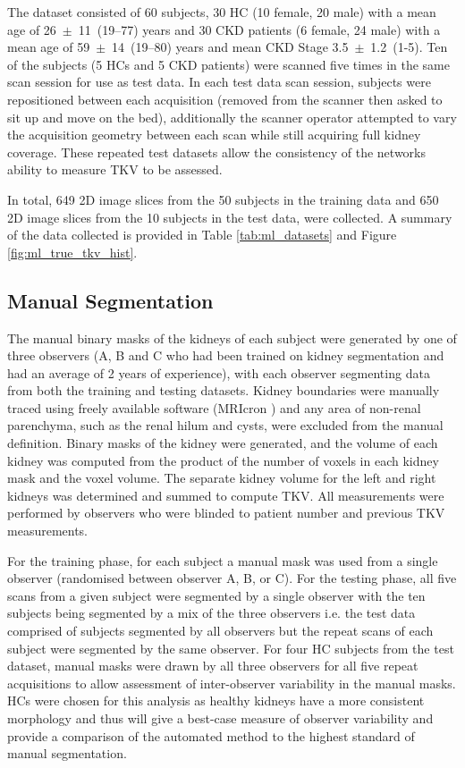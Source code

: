 \newpage
The dataset consisted of 60 subjects, 30 \ac{HC} (10 female, 20 male) with a mean age of 26~$\pm$~11~(19–77) years and 30 \ac{CKD} patients (6 female, 24 male) with a mean age of 59~$\pm$~14~(19–80) years and mean \ac{CKD} Stage 3.5~$\pm$~1.2~(1-5). Ten of the subjects (5 \ac{HC}s and 5 \ac{CKD} patients) were scanned five times in the same scan session for use as test data. In each test data scan session, subjects were repositioned between each acquisition (removed from the scanner then asked to sit up and move on the bed), additionally the scanner operator attempted to vary the acquisition geometry between each scan while still acquiring full kidney coverage. These repeated test datasets allow the consistency of the networks ability to measure \ac{TKV} to be assessed. 

In total, 649 2D image slices from the 50 subjects in the training data and 650 2D image slices from the 10 subjects in the test data, were collected. A summary of the data collected is provided in Table \ref{tab:ml_datasets} and Figure \ref{fig:ml_true_tkv_hist}.

\subsection{Manual Segmentation}
The manual binary masks of the kidneys of each subject were generated by one of three observers (A, B and C who had been trained on kidney segmentation and had an average of 2 years of experience), with each observer segmenting data from both the training and testing datasets. Kidney boundaries were manually traced using freely available software (MRIcron \cite{rorden_neurolabuscmricron_2021}) and any area of non-renal parenchyma, such as the renal hilum and cysts, were excluded from the manual definition. Binary masks of the kidney were generated, and the volume of each kidney was computed from the product of the number of voxels in each kidney mask and the voxel volume. The separate kidney volume for the left and right kidneys was determined and summed to compute \ac{TKV}. All measurements were performed by observers who were blinded to patient number and previous \ac{TKV} measurements. 

For the training phase, for each subject a manual mask was used from a single observer (randomised between observer A, B, or C). For the testing phase, all five scans from a given subject were segmented by a single observer with the ten subjects being segmented by a mix of the three observers i.e. the test data comprised of subjects segmented by all observers but the repeat scans of each subject were segmented by the same observer. For four \ac{HC} subjects from the test dataset, manual masks were drawn by all three observers for all five repeat acquisitions to allow assessment of inter-observer variability in the manual masks. \ac{HC}s were chosen for this analysis as healthy kidneys have a more consistent morphology and thus will give a best-case measure of observer variability and provide a comparison of the automated method to the highest standard of manual segmentation.

